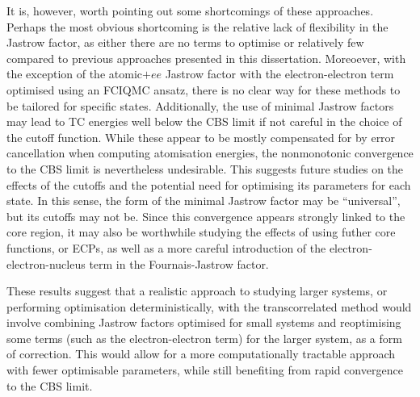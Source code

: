 It is, however, worth pointing out some shortcomings of these approaches. Perhaps the most obvious shortcoming is the relative lack of flexibility in the Jastrow factor, as either there are no terms to optimise or relatively few compared to previous approaches presented in this dissertation. Moreoever, with the exception of the atomic$+ee$ Jastrow factor with the electron-electron term optimised using an FCIQMC ansatz, there is no clear way for these methods to be tailored for specific states. Additionally, the use of minimal Jastrow factors may lead to TC energies well below the CBS limit if not careful in the choice of the cutoff function. While these appear to be mostly compensated for by error cancellation when computing atomisation energies, the nonmonotonic convergence to the CBS limit is nevertheless undesirable. This suggests future studies on the effects of the cutoffs and the potential need for optimising its parameters for each state. In this sense, the form of the minimal Jastrow factor may be ``universal'', but its cutoffs may not be. Since this convergence appears strongly linked to the core region, it may also be worthwhile studying the effects of using futher core functions, or \glspl{ECP}, as well as a more careful introduction of the electron-electron-nucleus term in the Fournais-Jastrow factor.

These results suggest that a realistic approach to studying larger systems, or performing optimisation deterministically, with the transcorrelated method would involve combining Jastrow factors optimised for small systems and reoptimising some terms (such as the electron-electron term) for the larger system, as a form of correction. This would allow for a more computationally tractable approach with fewer optimisable parameters, while still benefiting from rapid convergence to the CBS limit.
